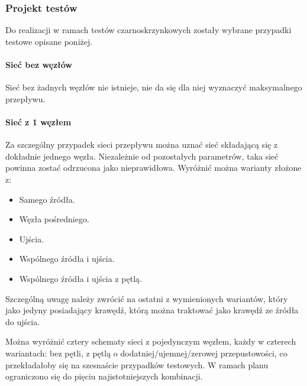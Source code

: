 \begin{itemize}[nosep]
\begin{itemize}[nosep]
\end{itemize}

\subsubsection{Projekt testów}
Do realizacji w ramach testów czarnoskrzynkowych zostały wybrane przypadki testowe opisane poniżej.

\paragraph{Sieć bez węzłów}
Sieć bez żadnych węzłów nie istnieje, nie da się dla niej wyznaczyć maksymalnego
przepływu.

\paragraph{Sieć z 1 węzłem}
Za szczególny przypadek sieci przepływu można uznać sieć składającą się z
dokładnie jednego węzła. Niezależnie od pozostałych parametrów, taka sieć
powinna zostać odrzucona jako nieprawidłowa. Wyróżnić można warianty złożone z:
\begin{itemize}[nosep]
    \item Samego źródła.
    \item Węzła pośredniego.
    \item Ujścia.
    \item Wspólnego źródła i ujścia.
    \item Wspólnego źródła i ujścia z pętlą.
\end{itemize}
Szczególną uwagę należy zwrócić na ostatni z wymienionych wariantów, który jako
jedyny posiadający krawędź, którą można traktować jako krawędź ze źródła do
ujścia.

Można wyróżnić cztery schematy sieci z pojedynczym węzłem, każdy w czterech
wariantach: bez pętli, z pętlą o dodatniej/ujemnej/zerowej przepustowości, co
przekładałoby się na szesnaście przypadków testowych. W ramach planu ograniczono
się do pięciu najistotniejszych kombinacji.


\end{itemize}
